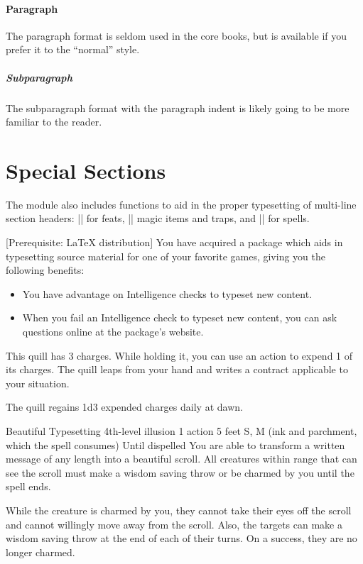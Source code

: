 \documentclass[letterpaper,twocolumn,openany,nodeprecatedcode]{dndbook}
\begin{document}
\paragraph{Paragraph}
The paragraph format is seldom used in the core books, but is available if you prefer it to the ``normal'' style.

\subparagraph{Subparagraph}
The subparagraph format with the paragraph indent is likely going to be more familiar to the reader.

\section{Special Sections}
The module also includes functions to aid in the proper typesetting of multi-line section headers: |\DndFeatHeader| for feats, |\DndItemHeader| magic items and traps, and |\DndSpellHeader| for spells.

[Prerequisite: \LaTeX{} distribution]
You have acquired a package which aids in typesetting source material for one of your favorite games, giving you the following benefits:

\begin{itemize}
  \item You have advantage on Intelligence checks to typeset new content.
  \item When you fail an Intelligence check to typeset new content, you can ask questions online at the package's website.
\end{itemize}

This quill has 3 charges. While holding it, you can use an action to expend 1 of its charges. The quill leaps from your hand and writes a contract applicable to your situation.

The quill regains 1d3 expended charges daily at dawn.

\DndSpellHeader%
  {Beautiful Typesetting}
  {4th-level illusion}
  {1 action}
  {5 feet}
  {S, M (ink and parchment, which the spell consumes)}
  {Until dispelled}
You are able to transform a written message of any length into a beautiful scroll. All creatures within range that can see the scroll must make a wisdom saving throw or be charmed by you until the spell ends.

While the creature is charmed by you, they cannot take their eyes off the scroll and cannot willingly move away from the scroll. Also, the targets can make a wisdom saving throw at the end of each of their turns. On a success, they are no longer charmed.
\end{document}
